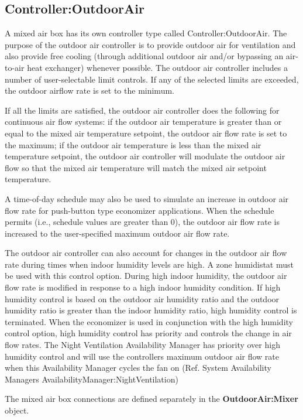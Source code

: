 \subsection{Controller:OutdoorAir}\label{controlleroutdoorair}

A mixed air box has its own controller type called Controller:OutdoorAir. The purpose of the outdoor air controller is to provide outdoor air for ventilation and also provide free cooling (through additional outdoor air and/or bypassing an air-to-air heat exchanger) whenever possible. The outdoor air controller includes a number of user-selectable limit controls. If any of the selected limits are exceeded, the outdoor airflow rate is set to the minimum.

If all the limits are satisfied, the outdoor air controller does the following for continuous air flow systems: if the outdoor air temperature is greater than or equal to the mixed air temperature setpoint, the outdoor air flow rate is set to the maximum; if the outdoor air temperature is less than the mixed air temperature setpoint, the outdoor air controller will modulate the outdoor air flow so that the mixed air temperature will match the mixed air setpoint temperature.

A time-of-day schedule may also be used to simulate an increase in outdoor air flow rate for push-button type economizer applications. When the schedule permits (i.e., schedule values are greater than 0), the outdoor air flow rate is increased to the user-specified maximum outdoor air flow rate.

The outdoor air controller can also account for changes in the outdoor air flow rate during times when indoor humidity levels are high. A zone humidistat must be used with this control option. During high indoor humidity, the outdoor air flow rate is modified in response to a high indoor humidity condition. If high humidity control is based on the outdoor air humidity ratio and the outdoor humidity ratio is greater than the indoor humidity ratio, high humidity control is terminated. When the economizer is used in conjunction with the high humidity control option, high humidity control has priority and controls the change in air flow rates. The Night Ventilation Availability Manager has priority over high humidity control and will use the controllers maximum outdoor air flow rate when this Availability Manager cycles the fan on (Ref. System Availability Managers AvailabilityManager:NightVentilation)

The mixed air box connections are defined separately in the \textbf{OutdoorAir:Mixer} object.

